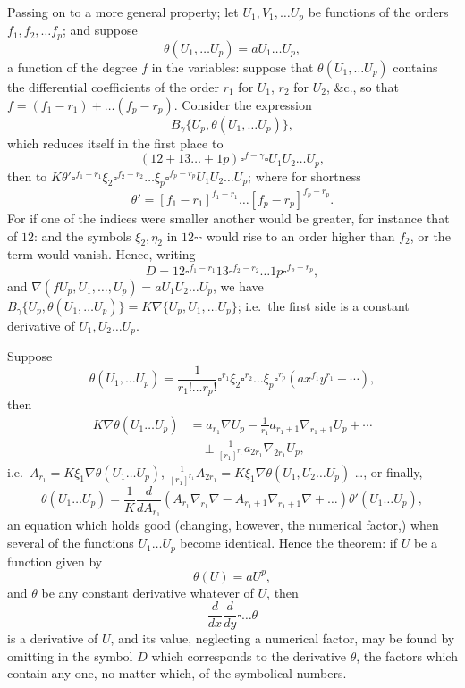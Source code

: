 \documentclass[11pt,a4paper]{book}
\begin{document}
\newpage
\setcounter{page}{110}

Passing on to a more general property; let $U_1, V_1, \ldots U_p$ be functions of the orders
$f_1, f_2, \ldots f_p$; and suppose
\[
\theta(U_1, \ldots U_p) = aU_1 \ldots U_p,
\]
a function of the degree $f$ in the variables: suppose that $\theta(U_1, \ldots U_p)$ contains the
differential coefficients of the order $r_1$ for $U_1$, $r_2$ for $U_2$, \&c., so that $f = (f_1 - r_1) + \ldots (f_p - r_p)$.
Consider the expression
\[
B_{\gamma}\{U_p, \theta(U_1, \ldots U_p)\},
\]
which reduces itself in the first place to
\[
(12 + 13 \ldots + 1p)\square^{f-\gamma} \square U_1 U_2 \ldots U_p,
\]
then to $K \theta' \square^{f_1-r_1} \xi_2 \square^{f_2-r_2} \ldots \xi_p \square^{f_p-r_p} U_1 U_2 \ldots U_p$;
where for shortness
\[
\theta' = [f_1-r_1]^{f_1-r_1} \ldots [f_p-r_p]^{f_p-r_p}.
\]
For if one of the indices were smaller another would be greater, for instance that of
$12$: and the symbols $\xi_2, \eta_2$ in $12 \square \square$ would rise to an order higher than $f_2$, or
the term would vanish. Hence, writing
\[
D = 12 \square^{f_1-r_1} 13 \square^{f_2-r_2} \ldots 1p \square^{f_p-r_p},
\]
and $\nabla(fU_p, U_1, \ldots, U_p) = aU_1 U_2 \ldots U_p$,
we have $B_{\gamma}\{U_p, \theta(U_1, \ldots U_p)\} = K \nabla\{U_p, U_1, \ldots U_p\}$;
i.e.\ the first side is a constant derivative of $U_1, U_2 \ldots U_p$.

Suppose
\[
\theta(U_1, \ldots U_p) = \frac{1}{r_1! \ldots r_p!} \square^{r_1} \xi_2 \square^{r_2} \ldots \xi_p \square^{r_p} (a x^{f_1} y^{r_1} + \cdots),
\]
then
\begin{align*}
K \nabla \theta(U_1 \ldots U_p) &= a_{r_1} \nabla U_p - \frac{1}{r_1} a_{r_1+1} \nabla_{r_1+1} U_p + \cdots\\
&\quad \pm \frac{1}{[r_1]^{r_1}} a_{2r_1} \nabla_{2r_1} U_p,
\end{align*}
i.e.\ $A_{r_1} = K \xi_1 \nabla \theta(U_1 \ldots U_p)$, $\frac{1}{[r_1]^{r_1}} A_{2r_1} = K \xi_1 \nabla \theta(U_1, U_2 \ldots U_p)$ \ldots,
or finally,
\[
\theta(U_1 \ldots U_p) = \frac{1}{K} \frac{d}{dA_{r_1}} (A_{r_1} \nabla_{r_1} \nabla - A_{r_1+1} \nabla_{r_1+1} \nabla + \ldots) \theta'(U_1 \ldots U_p),
\]
an equation which holds good (changing, however, the numerical factor,) when several
of the functions $U_1 \ldots U_p$ become identical. Hence the theorem: if $U$ be a function
given by
\[
\theta(U) = aU^p,
\]
and $\theta$ be any constant derivative whatever of $U$, then
\[
\frac{d}{dx} \frac{d}{dy} \square \ldots \theta
\]
is a derivative of $U$, and its value, neglecting a numerical factor, may be found by
omitting in the symbol $D$ which corresponds to the derivative $\theta$, the factors which
contain any one, no matter which, of the symbolical numbers.
\end{document}
